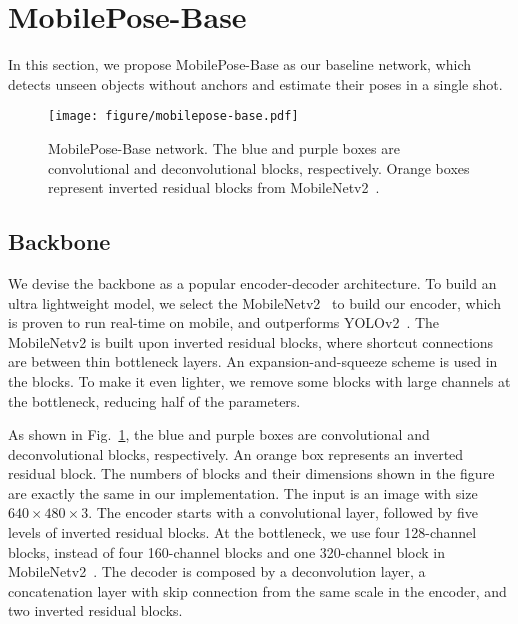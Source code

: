 \documentclass[runningheads]{llncs}
\begin{document}
\section{MobilePose-Base}
In this section, we propose MobilePose-Base as our baseline network, which detects unseen objects without anchors and estimate their poses in a single shot.

\begin{figure}[t]
    \centering
    \texttt{[image: figure/mobilepose-base.pdf]}
    \caption{MobilePose-Base network. The blue and purple boxes are convolutional and deconvolutional blocks, respectively. Orange boxes represent inverted residual blocks from MobileNetv2~\cite{Sandler_2018_MobileNetv2}.}
    \label{fig:base}
\end{figure}

\subsection{Backbone}
We devise the backbone as a popular encoder-decoder architecture. To build an ultra lightweight model, we select the MobileNetv2~\cite{Sandler_2018_MobileNetv2} to build our encoder, which is proven to run real-time on mobile, and outperforms YOLOv2~\cite{Redmon_2016_YOLOv2}. The MobileNetv2 is built upon inverted residual blocks, where shortcut connections are between thin bottleneck layers. An expansion-and-squeeze scheme is used in the blocks. To make it even lighter, we remove some blocks with large channels at the bottleneck, reducing half of the parameters.

As shown in Fig.~\ref{fig:base}, the blue and purple boxes are convolutional and deconvolutional blocks, respectively. An orange box represents an inverted residual block. The numbers of blocks and their dimensions shown in the figure are exactly the same in our implementation. The input is an image with size $640\times480\times3$. The encoder starts with a convolutional layer, followed by five levels of inverted residual blocks. At the bottleneck, we use four 128-channel blocks, instead of four 160-channel blocks and one 320-channel block in MobileNetv2~\cite{Sandler_2018_MobileNetv2}. The decoder is composed by a deconvolution layer, a concatenation layer with skip connection from the same scale in the encoder, and two inverted residual blocks.
\end{document}

